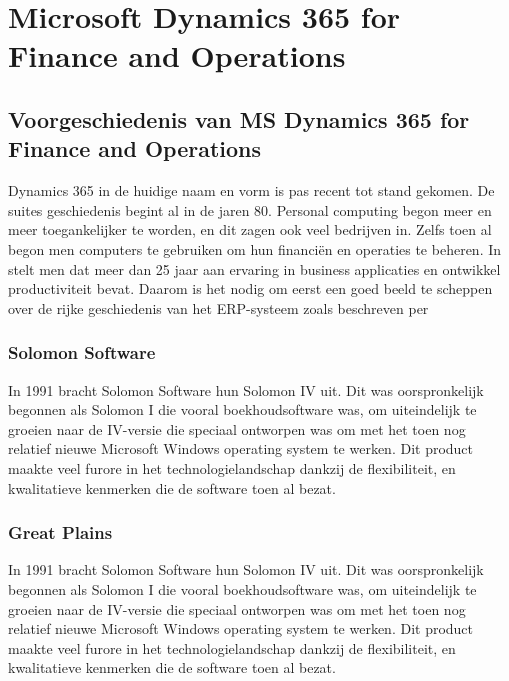 
\section{Microsoft Dynamics 365 for Finance and Operations}
\subsection{Voorgeschiedenis van MS Dynamics 365 for Finance and Operations}
Dynamics 365 in de huidige naam en vorm is pas recent tot stand gekomen. De suites geschiedenis begint al in de jaren 80. Personal computing begon meer en meer toegankelijker te worden, en dit zagen ook veel bedrijven in. Zelfs toen al begon men  computers te gebruiken om hun financiën en operaties te beheren. In \textcite{Olsen et al.2009} stelt men dat meer dan 25 jaar aan ervaring in business applicaties en ontwikkel productiviteit bevat. Daarom is het nodig om eerst een goed beeld te scheppen over de rijke geschiedenis van het ERP-systeem zoals beschreven per \textcite{Wright2018}

\subsubsection{Solomon Software }
In 1991 bracht Solomon Software hun Solomon IV uit. Dit was oorspronkelijk begonnen als Solomon I die vooral boekhoudsoftware was, om uiteindelijk te groeien naar de IV-versie die speciaal ontworpen was om met het toen nog relatief nieuwe Microsoft Windows operating system te werken. Dit product maakte veel furore in het technologielandschap dankzij de flexibiliteit, en kwalitatieve kenmerken die de software toen al bezat. 


\subsubsection{Great Plains }
In 1991 bracht Solomon Software hun Solomon IV uit. Dit was oorspronkelijk begonnen als Solomon I die vooral boekhoudsoftware was, om uiteindelijk te groeien naar de IV-versie die speciaal ontworpen was om met het toen nog relatief nieuwe Microsoft Windows operating system te werken. Dit product maakte veel furore in het technologielandschap dankzij de flexibiliteit, en kwalitatieve kenmerken die de software toen al bezat. 

